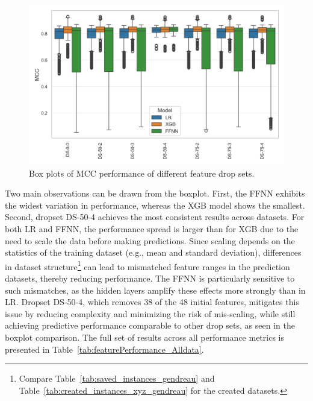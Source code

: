 \begin{figure}[ht]
    \centering
    \includegraphics[width = .85\textwidth]{pictures/feature_filter/all_data_exceptSubsets_box_plot.png}
    \caption{Box plots of MCC performance of different feature drop sets.}
    \label{fig:mcc_filter_results}
\end{figure}
Two main observations can be drawn from the boxplot. First, the FFNN exhibits the widest variation in performance, whereas the XGB model
shows the smallest. Second, dropset DS-50-4 achieves the most consistent results across datasets. For both LR and FFNN, the performance
spread is larger than for XGB due to the need to scale the data before making predictions. Since scaling depends on the statistics of
the training dataset (e.g., mean and standard deviation), differences in dataset structure\footnote{Compare Table~\ref{tab:saved_instances_gendreau} and Table~\ref{tab:created_instances_xyz_gendreau} for the created datasets.}
can lead to mismatched feature ranges in the prediction datasets, thereby reducing performance. The FFNN is particularly sensitive
to such mismatches, as the hidden layers amplify these effects more strongly than in LR. Dropset DS-50-4, which removes 38 of
the 48 initial features, mitigates this issue by reducing complexity and minimizing the risk of mis-scaling, while still
achieving predictive performance comparable to other drop sets, as seen in the boxplot comparison. The full set of results across
all performance metrics is presented in Table~\ref{tab:featurePerformance_Alldata}.

